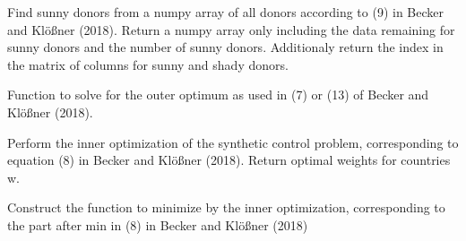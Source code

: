 \documentclass[a4paper,11pt,english]{sphinxmanual}
\begin{document}

\begin{fulllineitems}
\label{model_code:src.model_code.synth_control_functions.find_sunny_donors}
Find sunny donors from a numpy array of all donors according to (9)
in Becker and Klößner (2018). Return a numpy array only including the data
remaining for sunny donors and the number of sunny donors.
Additionaly return the index in the matrix of columns for sunny and shady
donors.

\end{fulllineitems}


\begin{fulllineitems}
\label{model_code:src.model_code.synth_control_functions.function_to_solve_for_outer_optimum}
Function to solve for the outer optimum as used in (7) or (13) of
Becker and Klößner (2018).

\end{fulllineitems}


\begin{fulllineitems}
\label{model_code:src.model_code.synth_control_functions.inner_optimization}
Perform the inner optimization of the synthetic control problem,
corresponding to equation (8) in Becker and Klößner (2018).
Return optimal weights for countries w.

\end{fulllineitems}


\begin{fulllineitems}
\label{model_code:src.model_code.synth_control_functions.inner_optimization_function}
Construct the function to minimize by the inner optimization, 
corresponding to the part after min in (8) in Becker and Klößner (2018)

\end{fulllineitems}
\end{document}

